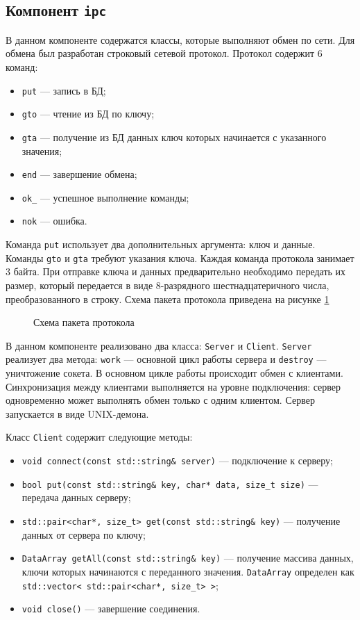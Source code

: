 \subsection{Компонент \texttt{ipc}}
В данном компоненте содержатся классы, которые выполняют обмен по сети. Для обмена был разработан строковый сетевой протокол. Протокол содержит 6 команд: 
\begin{itemize}
\item \texttt{put} --- запись в БД;
\item \texttt{gto} --- чтение из БД по ключу;
\item \texttt{gta} --- получение из БД данных ключ которых начинается с указанного значения;
\item \texttt{end} --- завершение обмена;
\item \texttt{ok_} --- успешное выполнение команды;
\item \texttt{nok} --- ошибка.
\end{itemize}
Команда \texttt{put} использует два дополнительных аргумента: ключ и данные. Команды \texttt{gto} и \texttt{gta} требуют указания ключа. Каждая команда протокола занимает 3 байта. При отправке ключа и данных предварительно необходимо передать их размер, который передается в виде 8-разрядного шестнадцатеричного числа, преобразованного в строку. Схема пакета протокола приведена на рисунке \ref{image:packageStructure}
\begin{figure}[h!]
\caption{Схема пакета протокола}
\label{image:packageStructure}
\end{figure}

В данном компоненте реализовано два класса: \texttt{Server} и \texttt{Client}. \texttt{Server} реализует два метода: \texttt{work} --- основной цикл работы сервера и \texttt{destroy} --- уничтожение сокета. В основном цикле работы происходит обмен с клиентами. Синхронизация между клиентами выполняется на уровне подключения: сервер одновременно может выполнять обмен только с одним клиентом. Сервер запускается в виде UNIX-демона.

Класс \texttt{Client} содержит следующие методы: 
\begin{itemize}
\item \texttt{void connect(const std::string\& server)} --- подключение к серверу;
\item \texttt{bool put(const std::string\& key, char* data, size_t size)} --- передача данных серверу;
\item \texttt{std::pair<char*, size_t> get(const std::string\& key)} --- получение данных от сервера по ключу;
\item \texttt{DataArray getAll(const std::string\& key)} --- получение массива данных, ключи которых начинаются с переданного значения. \texttt{DataArray} определен как \texttt{std::vector< std::pair<char*, size_t> >};
\item \texttt{void close()} --- завершение соединения.
\end{itemize}


